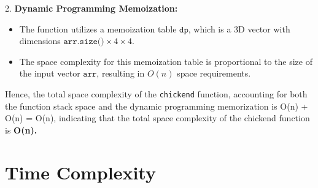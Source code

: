 \documentclass[8pt]{article}
\begin{document}
2. \textbf{Dynamic Programming Memoization:}
   \begin{itemize}
       \item The function utilizes a memoization table $\texttt{dp}$, which is a 3D vector with dimensions $\texttt{arr.size()} \times 4 \times 4$.
       \item The space complexity for this memoization table is proportional to the size of the input vector $\texttt{arr}$, resulting in\textbf{ $O(n)$ }space requirements.
   \end{itemize}

Hence, the total space complexity of the \texttt{chickend} function, accounting for both the function stack space and the dynamic programming memorization is O(n) + O(n) = O(n), indicating that the total space complexity of the chickend function is \textbf{O(n).}







\section{Time Complexity}
\end{document}
